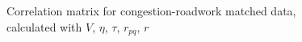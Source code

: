 \begin{figure}[!ht]
	\centering
	\caption{Correlation matrix for congestion-roadwork matched data, calculated with $V$, $\eta$, $\tau$, $r_{pq}$, $r$}
	\label{img:correlation_matrix_arbis_selected_effector_cramers}
\end{figure}


